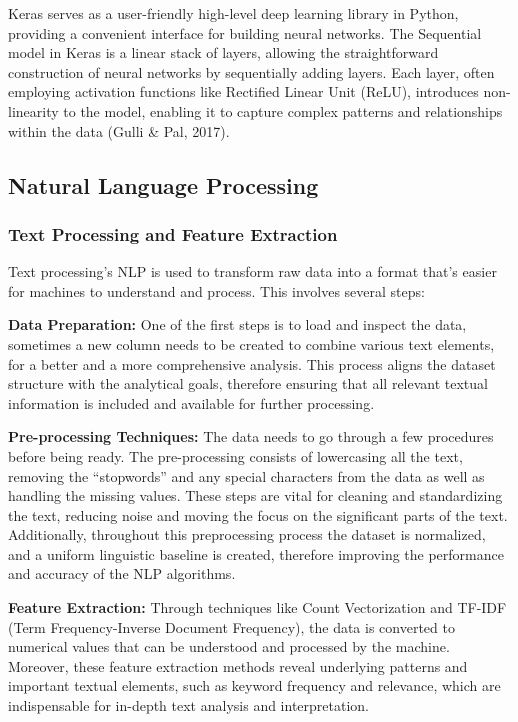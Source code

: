 \documentclass{article}
\begin{document}
\begin{multicols}{2}
Keras serves as a user-friendly high-level deep learning library in Python, providing a convenient interface for building neural networks. The Sequential model in Keras is a linear stack of layers, allowing the straightforward construction of neural networks by sequentially adding layers. Each layer, often employing activation functions like Rectified Linear Unit (ReLU), introduces non-linearity to the model, enabling it to capture complex patterns and relationships within the data (Gulli \& Pal, 2017). 


\subsection{Natural Language Processing}

\subsubsection{Text Processing and Feature Extraction}

Text processing's NLP is used to transform raw data into a format that's easier for machines to understand and process. This involves several steps:

\textbf{Data Preparation:}
One of the first steps is to load and inspect the data, sometimes a new column needs to be created to combine various text elements, for a better and a more comprehensive analysis. This process aligns the dataset structure with the analytical goals, therefore ensuring that all relevant textual information is included and available for further processing.

\textbf{Pre-processing Techniques:}
The data needs to go through a few procedures before being ready. The pre-processing consists of lowercasing all the text, removing the “stopwords” and any special characters from the data as well as handling the missing values. These steps are vital for cleaning and standardizing the text, reducing noise and moving the focus on the significant parts of the text. Additionally, throughout this preprocessing process the dataset is normalized, and a uniform linguistic baseline is created, therefore improving the performance and accuracy of the NLP algorithms.

\textbf{Feature Extraction:}
Through techniques like Count Vectorization and TF-IDF (Term Frequency-Inverse Document Frequency), the data is converted to numerical values that can be understood and processed by the machine. Moreover, these feature extraction methods reveal underlying patterns and important textual elements, such as keyword frequency and relevance, which are indispensable for in-depth text analysis and interpretation.



\end{multicols}
\end{document}
